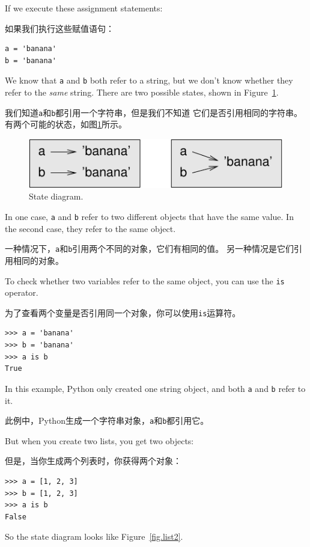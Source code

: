 \documentclass[10pt]{book}
\begin{document}
\begin{CJK}{UTF8}{gbsn}
If we execute these assignment statements:

如果我们执行这些赋值语句：

\begin{verbatim}
a = 'banana'
b = 'banana'
\end{verbatim}
%
We know that {\tt a} and {\tt b} both refer to a
string, but we don't
know whether they refer to the {\em same} string.
There are two possible states, shown in Figure~\ref{fig.list1}.

我们知道{\tt a}和{\tt b}都引用一个字符串，但是我们不知道
它们是否引用相同的字符串。
有两个可能的状态，如图\ref{fig.list1}所示。

\begin{figure}
\centerline
{\includegraphics[scale=0.8]{figs/list1.pdf}}
\caption{State diagram.}
\label{fig.list1}
\end{figure}


In one case, {\tt a} and {\tt b} refer to two different objects that
have the same value.  In the second case, they refer to the same
object.

一种情况下，{\tt a}和{\tt b}引用两个不同的对象，它们有相同的值。
另一种情况是它们引用相同的对象。

To check whether two variables refer to the same object, you can
use the {\tt is} operator.

为了查看两个变量是否引用同一个对象，你可以使用{\tt is}运算符。

\begin{verbatim}
>>> a = 'banana'
>>> b = 'banana'
>>> a is b
True
\end{verbatim}
%
In this example, Python only created one string object,
and both {\tt a} and {\tt b} refer to it.

此例中，Python生成一个字符串对象，{\tt a}和{\tt b}都引用它。

But when you create two lists, you get two objects:

但是，当你生成两个列表时，你获得两个对象：

\begin{verbatim}
>>> a = [1, 2, 3]
>>> b = [1, 2, 3]
>>> a is b
False
\end{verbatim}
%
So the state diagram looks like Figure~\ref{fig.list2}.


\end{CJK}
\end{document}
